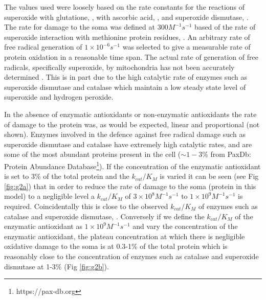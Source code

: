 \documentclass[preprint,12pt,authoryear]{elsarticle}
\begin{document}
The values used were loosely based on the rate constants for the reactions of superoxide with glutatione, \citet{Winterbourn:2016cu}, 
with ascorbic acid, \citet{Buettner:1996vo},
and superoxide dismutase, \citet{Milgrom:2016iw}. The rate for damage to the soma was defined at $300 M^{-1} s^{-1}$ based of the rate of superoxide
interaction with methionine protein residues, \citet{Davies:2016kz}.
An arbitrary rate of free radical generation of $1 \times 10^{-6} s^{-1}$ was selected to give a
measurable rate of protein oxidation in a reasonable time span. The actual rate of
generation of free radicals, specifically superoxide, by mitochondria has not been accurately determined \cite{Murphy:2009jy}. This is in part due to the high catalytic rate of enzymes such as superoxide dismutase and catalase which maintain a low steady state level of superoxide and hydrogen peroxide.

In the absence of enzymatic antioxidants or non-enzymatic antioxidants the rate of damage to the protein was, as would be
expected, linear and proportional (not shown).
Enzymes involved in the defence against free radical damage such as superoxide dismutase and catalase have extremely high catalytic rates, and are some of the most abundant proteins present in the cell ($\sim 1-3$\% from PaxDb:
Protein Abundance Database\footnote{https://pax-db.org}). If the concentration of the enzymatic antioxidant is
set to 3\% of the total protein and the $k_{cat}/K_M$ is varied it can be seen (see Fig \ref{fig:g2a}) that
in order to reduce the rate of damage to the soma (protein in this model) to a negligible level a $k_{cat}/K_M$ of
$3 \times 10^8 M^{-1} s^{-1}$ to $1 \times 10^9 M^{-1} s^{-1}$ is required.
Coincidentally this is close to the observed
$k_{cat}/K_M$ of enzymes such as catalase and superoxide dismutase, \citet{Milgrom:2016iw}. Conversely if we define the $k_{cat}/K_M$ of
the enzymatic antioxidant as $1 \times 10^9 M^{-1} s^{-1}$ and vary the concentration of the enzymatic antioxidant, the plateau
concentration at which there is negligible oxidative damage to the soma is at
0.3-1\% of the total protein which is reasonably close to the concentration of enzymes such as catalase and superoxide dismutase
at 1-3\% (Fig \ref{fig:g2b}).
\end{document}
